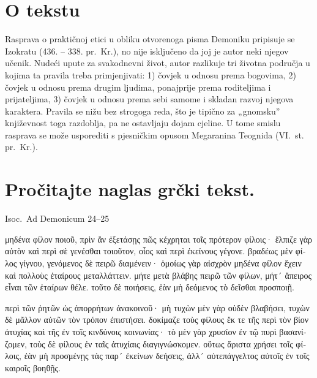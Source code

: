 


\section*{O tekstu}

Rasprava o praktičnoj etici u obliku otvorenoga pisma Demoniku pripisuje se Izokratu (436. – 338. pr.~Kr.), no nije isključeno da joj je autor neki njegov učenik. Nudeći upute za svakodnevni život, autor razlikuje tri životna područja u kojima ta pravila treba primjenjivati: 1) čovjek u odnosu prema bogovima, 2) čovjek u odnosu prema drugim ljudima, ponajprije prema roditeljima i prijateljima, 3) čovjek u odnosu prema sebi samome i skladan razvoj njegova karaktera. Pravila se nižu bez strogoga reda, što je tipično za „gnomsku” književnost toga razdoblja, pa ne ostavljaju dojam cjeline. U tome smislu rasprava se može usporediti s pjesničkim opusom Megaranina Teognida (VI.~st. pr.~Kr.).

\newpage

\section*{Pročitajte naglas grčki tekst.}

Isoc.\ Ad Demonicum 24–25


\medskip


{\large

\begin{greek}

\noindent μηδένα φίλον ποιοῦ, πρὶν ἂν ἐξετάσῃς πῶς κέχρηται τοῖς πρότερον φίλοις· ἔλπιζε γὰρ αὐτὸν καὶ περὶ σὲ γενέσθαι τοιοῦτον, οἷος καὶ περὶ ἐκείνους γέγονε. βραδέως μὲν φίλος γίγνου, γενόμενος δὲ πειρῶ διαμένειν· ὁμοίως γὰρ αἰσχρὸν μηδένα φίλον ἔχειν καὶ πολλοὺς ἑταίρους μεταλλάττειν. μήτε μετὰ βλάβης πειρῶ τῶν φίλων, μήτ´ ἄπειρος εἶναι τῶν ἑταίρων θέλε. τοῦτο δὲ ποιήσεις, ἐὰν μὴ δεόμενος τὸ δεῖσθαι προσποιῇ.

\noindent περὶ τῶν ῥητῶν ὡς ἀπορρήτων ἀνακοινοῦ· μὴ τυχὼν μὲν γὰρ οὐδὲν βλαβήσει, τυχὼν δὲ μᾶλλον αὐτῶν τὸν τρόπον ἐπιστήσει. δοκίμαζε τοὺς φίλους ἔκ τε τῆς περὶ τὸν βίον ἀτυχίας καὶ τῆς ἐν τοῖς κινδύνοις κοινωνίας· τὸ μὲν γὰρ χρυσίον ἐν τῷ πυρὶ βασανίζομεν, τοὺς δὲ φίλους ἐν ταῖς ἀτυχίαις διαγιγνώσκομεν. οὕτως ἄριστα χρήσει τοῖς φίλοις, ἐὰν μὴ προσμένῃς τὰς παρ´ ἐκείνων δεήσεις, ἀλλ´ αὐτεπάγγελτος αὐτοῖς ἐν τοῖς καιροῖς βοηθῇς.

\end{greek}

}


